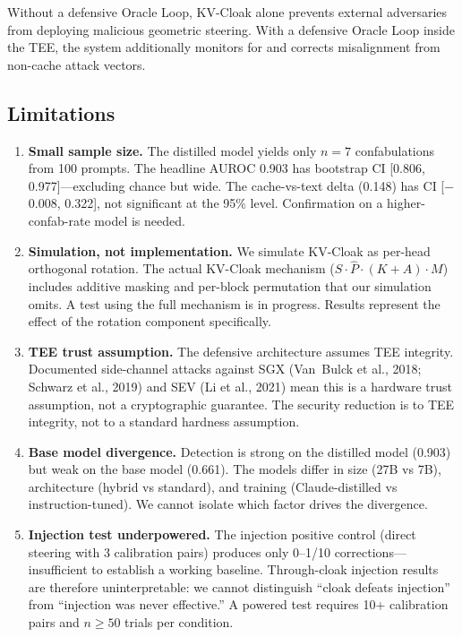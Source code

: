 \documentclass[11pt,a4paper]{article}
\begin{document}
Without a defensive Oracle Loop, KV-Cloak alone prevents external
adversaries from deploying malicious geometric steering. With a
defensive Oracle Loop inside the TEE, the system additionally monitors
for and corrects misalignment from non-cache attack vectors.

\subsection{Limitations}

\begin{enumerate}
\item \textbf{Small sample size.} The distilled model yields only
$n=7$ confabulations from 100 prompts. The headline AUROC 0.903 has
bootstrap CI [0.806, 0.977]---excluding chance but wide. The
cache-vs-text delta (0.148) has CI [$-$0.008, 0.322], not significant
at the 95\% level. Confirmation on a higher-confab-rate model is needed.

\item \textbf{Simulation, not implementation.} We simulate KV-Cloak as
per-head orthogonal rotation. The actual KV-Cloak mechanism
($S \cdot \hat{P} \cdot (K + A) \cdot M$) includes additive masking
and per-block permutation that our simulation omits. A test using the
full mechanism is in progress. Results represent the effect of the
rotation component specifically.

\item \textbf{TEE trust assumption.} The defensive architecture assumes
TEE integrity. Documented side-channel attacks against SGX
(Van~Bulck et al., 2018; Schwarz et al., 2019) and SEV
(Li et al., 2021) mean this is a hardware trust assumption, not a
cryptographic guarantee. The security reduction is to TEE integrity,
not to a standard hardness assumption.

\item \textbf{Base model divergence.} Detection is strong on the
distilled model (0.903) but weak on the base model (0.661). The models
differ in size (27B vs 7B), architecture (hybrid vs standard), and
training (Claude-distilled vs instruction-tuned). We cannot isolate
which factor drives the divergence.

\item \textbf{Injection test underpowered.} The injection positive
control (direct steering with 3 calibration pairs) produces only
0--1/10 corrections---insufficient to establish a working baseline.
Through-cloak injection results are therefore uninterpretable: we
cannot distinguish ``cloak defeats injection'' from ``injection was
never effective.'' A powered test requires 10+ calibration pairs and
$n \geq 50$ trials per condition.


\end{enumerate}
\end{document}
